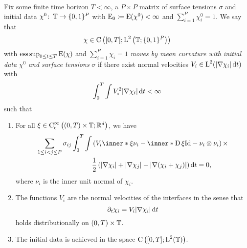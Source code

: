 \begin{definition}
	\label{motion_by_mmcf}
	Fix some finite time horizon $ T < \infty $, a $ P \times P $ matrix of 
	surface tensions $ \sigma $ and initial data $ \chi^{ 0 } \colon \operatorname{\mathbb{T}} 
	\to \{ 0 , 1 \}^{ P } $ with $ \operatorname{E}_{ 0 } \coloneqq \operatorname{E} ( \chi^{ 0 } 
	) < \infty $ and 
	$ \sum_{ i = 1 }^{ P } \chi_{ i }^{ 0 } = 1 $. We say that
	\begin{equation*}
		\chi \in \operatorname{C} \left(
		[ 0 , T ]
		;
		\operatorname{L}^{ 2 } \left( \operatorname{\mathbb{T}} ; \{ 0 , 1 \}^{ P } \right)
		\right)
	\end{equation*}
	with $ \operatorname*{ess\,sup}_{ 0 \leq t \leq T } \operatorname{E} ( \chi ) $ and $ \sum_{ i = 1 
	}^{ P } \chi_{ i } = 1 $ \emph{moves by mean curvature with initial data} $ 
	\chi^{ 0 } $ \emph{and surface tensions} $ \sigma $ if there exist normal 
	velocities $ V_{ i } \in \operatorname{L}^{ 2 } ( \abs{ \nabla \chi_{ i } } \dd{ t } ) $ 
	with
	\begin{equation*}
		\int_{ 0 }^{ T }
		\int
		V_{ i }^{ 2 }
		\abs{ \nabla \chi_{ i } }
		\dd{ t }
		< \infty 
	\end{equation*} 
	such that
	\begin{enumerate}
		\item For all 
		$ \xi \in \operatorname{C}_{ \mathrm{c} }^{ \infty } \left(
		( 0 , T ) \times \operatorname{\mathbb{T}} ; \mathbb{ R }^{ d }
		\right)
		$, we have 
		\begin{align}
			\label{distributional_equation_mmcf}
			\sum_{ 1 \leq i < j \leq P }
			\sigma_{ i j }
			\int_{ 0 }^{ T }
			\int
			&
			\left(
			V_{ i } \inner*{ \xi }{ \nu_{ i } }
			-
			\inner*{ \diff \xi }{ \mathrm{Id} - \nu_{ i } \otimes \nu_{ i } }
			\right)
			\times
			\\
			\notag
			& \frac{1}{ 2 }
			\left(
			\abs{ \nabla \chi_{ i } }
			+
			\abs{ \nabla \chi_{ j } }
			-
			\abs{ \nabla ( \chi_{ i } + \chi_{ j } ) }
			\right)
			\dd{ t }
			=0,			
		\end{align}
		where $ \nu_{ i } $ is the inner unit normal of $ \chi_{ i } $.
		
		\item 
		The functions $ V_{ i } $ are the normal velocities of the interfaces 
		in the sense that
		\begin{equation*}
			\partial_{ t } \chi_{ i }
			=
			V_{ i } \abs{ \nabla \chi_{ i } } \dd{ t }
		\end{equation*}
		holds distributionally on $ ( 0 , T ) \times \operatorname{\mathbb{T}} $.
		
		\item
		The initial data is achieved in the space $ \operatorname{C} \left( [ 0 , T ] ; 
		\operatorname{L}^{ 2 } ( \operatorname{\mathbb{T}} ) \right) $.
	\end{enumerate}
\end{definition}

